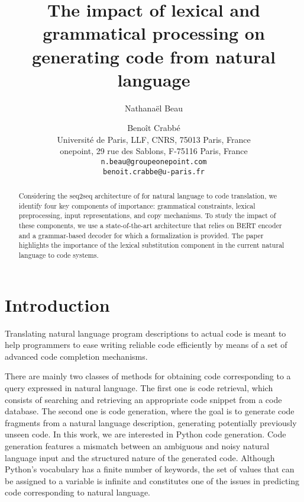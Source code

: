 \documentclass[11pt]{article}
\title{The impact of lexical and grammatical processing on generating code from natural language}
\author{Nathanaël Beau \and Benoît Crabbé \\
        Université de Paris, LLF, CNRS, 75013 Paris, France \\  onepoint, 29 rue des Sablons, F-75116 Paris, France \\
       \texttt{n.beau@groupeonepoint.com} \\
       \texttt{benoit.crabbe@u-paris.fr} }
\begin{document}
\maketitle
\begin{abstract}

Considering the seq2seq architecture of \citet{tranx-2018} for natural language to code translation, we identify four key components of importance: grammatical constraints, lexical preprocessing, input representations, and copy mechanisms. To study the impact of these components, we use a state-of-the-art architecture that relies on BERT encoder and a grammar-based decoder for which a formalization is provided. The paper highlights the importance of the lexical substitution component in the current natural language to code systems.

\end{abstract}

\section{Introduction}

Translating natural language program descriptions to actual code is meant to help programmers to ease writing reliable code efficiently by means of a set of advanced code completion mechanisms.



There are mainly two classes of methods for obtaining code corresponding to a query expressed in natural language. The first one is code retrieval, which consists of searching and retrieving an appropriate code snippet from a code database. 
The second one is code generation, where the goal is to generate code fragments from a natural language description, generating potentially previously unseen code. In this work, we are interested in Python code generation. Code generation features a mismatch between an ambiguous and noisy natural language input and the structured nature of the generated code. Although Python's vocabulary has a finite number of keywords, the set of values that can be assigned to a variable is infinite and constitutes one of the issues in predicting code corresponding to natural language. 
\end{document}
